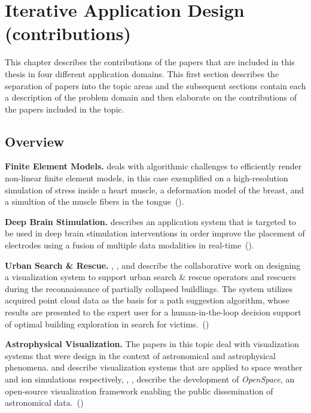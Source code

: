 
\chapter{Iterative Application Design (contributions)}
\label{cha:contributions}

This chapter describes the contributions of the papers that are included in this thesis in four different application domains.  This first section describes the separation of papers into the topic areas and the subsequent sections contain each a description of the problem domain and then elaborate on the contributions of the papers included in the topic.

\section{Overview} \label{contributions:overview}

\textbf{Finite Element Models. }  deals with algorithmic challenges to efficiently render non-linear finite element models, in this case exemplified on a high-resolution simulation of stress inside a heart muscle, a deformation model of the breast, and a simultion of the muscle fibers in the tongue~().

\textbf{Deep Brain Stimulation. }  describes an application system that is targeted to be used in deep brain stimulation interventions in order improve the placement of electrodes using a fusion of multiple data modalities in real-time~().

\textbf{Urban Search \& Rescue. } , , and  describe the collaborative work on designing a visualization system to support urban search \& rescue operators and rescuers during the reconnaissance of partially collapsed buildlings.  The system utilizes acquired  point cloud data as the basis for a path suggestion algorithm, whose results are presented to the expert user for a human-in-the-loop decision support of optimal building exploration in search for victims.~()

\textbf{Astrophysical Visualization. } The papers in this topic deal with visualization systems that were design in the context of astronomical and astrophysical phenomena.  and  describe visualization systems that are applied to space weather and ion simulations respectively, , ,  describe the development of \emph{OpenSpace}, an open-source visualization framework enabling the public dissemination of astronomical data.~()

